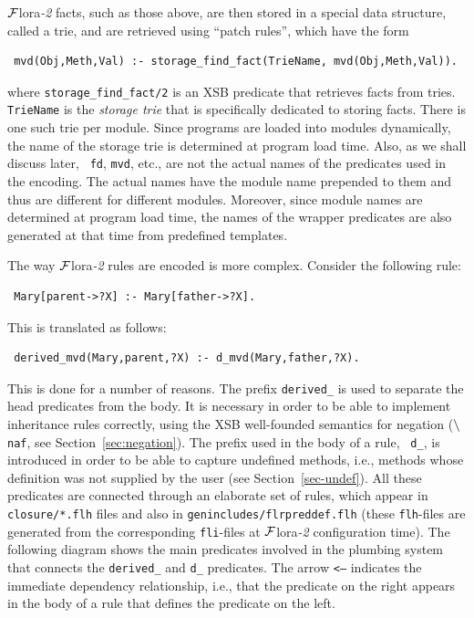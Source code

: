 \documentclass[11pt]{article}
\newcommand{\FLSYSTEM}{{\mbox{\sc ${\cal F}${lora}\rm\emph{-2}}}\xspace}
\newcommand{\RULELOGNAF}{{\texttt{\ensuremath{\tt\backslash}naf}}\xspace}
\begin{document}
\FLSYSTEM facts, such as those above, are then stored in a special data structure,
called a {\rm trie}, and are retrieved using  ``patch rules'', which have the
form
\begin{verbatim}
 mvd(Obj,Meth,Val) :- storage_find_fact(TrieName, mvd(Obj,Meth,Val)).  
\end{verbatim}
where {\tt storage\_find\_fact/2} is an XSB predicate that retrieves facts
from tries. {\tt TrieName} is the \emph{storage trie} that is specifically
dedicated to storing facts. There is one such trie per module. Since
programs are loaded into modules dynamically, the name of the storage trie
is determined at program load time. Also, as we shall discuss later, {\tt
  fd}, {\tt mvd}, etc., are not the actual names of the predicates used in
the encoding. The actual names have the module name prepended to them and
thus are different for different modules. Moreover, since module names are
determined at program load time, the names of the wrapper predicates are
also generated at that time from predefined templates.

The way \FLSYSTEM rules are encoded is more complex. Consider the following rule:
\begin{verbatim}
 Mary[parent->?X] :- Mary[father->?X].  
\end{verbatim}
This is translated as follows:
\begin{verbatim}
 derived_mvd(Mary,parent,?X) :- d_mvd(Mary,father,?X).  
\end{verbatim}
This is done for a number of reasons. The prefix {\tt derived\_} is used to
separate the head predicates from the body. It is necessary in order to
be able to implement inheritance rules correctly, using the XSB
well-founded semantics for negation (\RULELOGNAF, see
Section~\ref{sec:negation}). The prefix used in the body of a rule, {\tt
  d\_}, is introduced in order to be able to capture undefined methods,
i.e., methods whose definition was not supplied by the user (see
Section~\ref{sec-undef}). All these predicates are connected through an
elaborate set of rules, which appear in {\tt closure/*.flh} files and also
in {\tt genincludes/flrpreddef.flh} (these {\tt flh}-files are generated
from the corresponding {\tt fli}-files at \FLSYSTEM configuration time).
The following diagram shows the main
predicates involved in the plumbing system that connects
the {\tt derived\_} and {\tt d\_} predicates. The arrow {\tt <---} indicates the
immediate dependency relationship, i.e., that the predicate on the
right appears in the body of a rule that defines the predicate on the left.
\end{document}
